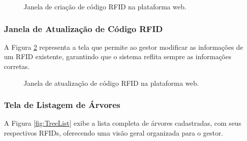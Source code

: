 \begin{figure}[H]
 \centering
 \caption{Janela de criação de código RFID na plataforma web.}
 \label{fig:CreateRfid}
\end{figure}

\subsubsection{Janela de Atualização de Código RFID}
A Figura \ref{fig:UpdateRfid} representa a tela que permite ao gestor modificar as informações de um RFID existente, garantindo que o sistema reflita sempre as informações corretas.

\begin{figure}[H]
 \centering
 \caption{Janela de atualização de código RFID na plataforma web.}
 \label{fig:UpdateRfid}
\end{figure}

\subsubsection{Tela de Listagem de Árvores}
A Figura \ref{fig:TreeList} exibe a lista completa de árvores cadastradas, com seus respectivos RFIDs, oferecendo uma visão geral organizada para o gestor.

